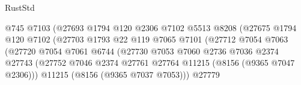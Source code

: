 \begin{lexlean}{RustStd}
\begin{coremodule}
                                              @745
                                              @7103
                                              (@27693
                                                @1794
                                                @120
                                                @2306
                                                @7102
                                                @5513
                                                @8208
                                                (@27675
                                                  @1794
                                                  @120
                                                  @7102
                                                  (@27703
                                                    @1793
                                                    @22
                                                    @119
                                                    @7065
                                                    @7101
                                                    (@27712
                                                      @7054
                                                      @7063
                                                      (@27720
                                                        @7054
                                                        @7061
                                                        @6744
                                                        (@27730
                                                          @7053
                                                          @7060
                                                          @2736
                                                          @7036
                                                          @2374
                                                          @27743
                                                          (@27752
                                                            @7046
                                                            @2374
                                                            @27761
                                                            @27764
                                                            @11215
                                                            (@8156 (@9365 @7047 @2306)))
                                                          @11215
                                                          (@8156 (@9365 @7037 @7053)))
                                                        @27779

\end{coremodule}
\end{lexlean}
